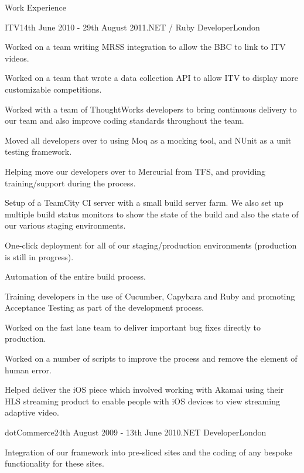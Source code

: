 \documentclass{resume}
\begin{document}
\begin{rSection}{Work Experience}
    \begin{rSubsection}{ITV}{14th June 2010 - 29th August 2011}{.NET / Ruby Developer}{London}
      \item Worked on a team writing MRSS integration to allow the BBC to link to ITV videos.
      \item Worked on a team that wrote a data collection API to allow ITV to display more customizable competitions.
      \item Worked with a team of ThoughtWorks developers to bring continuous delivery to our team and also improve coding standards throughout the team.
      \item Moved all developers over to using Moq as a mocking tool, and NUnit as a unit testing framework.
      \item Helping move our developers over to Mercurial from TFS, and providing training/support during the process.
      \item Setup of a TeamCity CI server with a small build server farm. We also set up multiple build status monitors to show the state of the build and also the state of our various staging environments.
      \item One-click deployment for all of our staging/production environments (production is still in progress).
      \item Automation of the entire build process.
      \item Training developers in the use of Cucumber, Capybara and Ruby and promoting Acceptance Testing as part of the development process.
      \item Worked on the fast lane team to deliver important bug fixes directly to production.
      \item Worked on a number of scripts to improve the process and remove the element of human error.
      \item Helped deliver the iOS piece which involved working with Akamai using their HLS streaming product to enable people with iOS devices to view streaming adaptive video.
    \end{rSubsection}

    \begin{rSubsection}{dotCommerce}{24th August 2009 - 13th June 2010}{.NET Developer}{London}
      \item Integration of our framework into pre-sliced sites and the coding of any bespoke functionality for these sites.
    \end{rSubsection}


\end{rSection}
\end{document}
